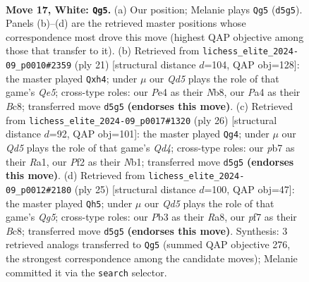 \documentclass[11pt]{article}
\begin{document}
\begin{figure}[p]\centering
\begin{subfigure}{0.46\textwidth}\centering
\resizebox{\linewidth}{!}{%
\newchessgame
\chessboard[
  setfen={2br3k/1p2qp1p/r1nb1np1/p2Q4/P3P3/1P3NP1/1B3PBP/RN2R1K1 w - - 1 17},
  showmover=false,
  pgfstyle=straightmove, color=movearrow, markmove={d5-g5}
]}
\caption{}
\end{subfigure}\hfill
\begin{subfigure}{0.46\textwidth}\centering
\resizebox{\linewidth}{!}{%
\newchessgame
\chessboard[
  setfen={rnb2rk1/pp3pp1/4pn1p/8/1b1Nq2B/2NBP3/PPQ2PPP/R3K2R b KQ - 2 11},
  showmover=false,
  pgfstyle=straightmove, color=movearrow, markmove={e4-h4}
]}
\caption{}
\end{subfigure}
\\[4pt]
\begin{subfigure}{0.46\textwidth}\centering
\resizebox{\linewidth}{!}{%
\newchessgame
\chessboard[
  setfen={r1br2k1/pp2bppp/q1n1p3/3nP3/2NQ4/1P4P1/PB3PBP/RN3RK1 w - - 1 14},
  showmover=false,
  pgfstyle=straightmove, color=movearrow, markmove={d4-g4}
]}
\caption{}
\end{subfigure}\hfill
\begin{subfigure}{0.46\textwidth}\centering
\resizebox{\linewidth}{!}{%
\newchessgame
\chessboard[
  setfen={r1b1k2r/1p2bppp/p3pn2/8/P1B3q1/2N2P2/1P2Q1PP/R1BR2K1 b kq - 0 13},
  showmover=false,
  pgfstyle=straightmove, color=movearrow, markmove={g4-h5}
]}
\caption{}
\end{subfigure}
\caption{\textbf{Move 17, White: \texttt{Qg5}.} (a) Our position; Melanie plays \texttt{Qg5} (\texttt{d5g5}). Panels (b)--(d) are the retrieved master positions whose correspondence most drove this move (highest QAP objective among those that transfer to it). (b) Retrieved from \texttt{lichess\_elite\_2024-09\_p0010\#2359} (ply 21) [structural distance $d$=104, QAP obj=128]: the master played \texttt{Qxh4}; under $\mu$ our \emph{Qd5} plays the role of that game's \emph{Qe5}; cross-type roles: our \emph{P}e4 as their \emph{N}b8, our \emph{P}a4 as their \emph{B}c8; transferred move \texttt{d5g5} \textbf{(endorses this move)}. (c) Retrieved from \texttt{lichess\_elite\_2024-09\_p0017\#1320} (ply 26) [structural distance $d$=92, QAP obj=101]: the master played \texttt{Qg4}; under $\mu$ our \emph{Qd5} plays the role of that game's \emph{Qd4}; cross-type roles: our \emph{p}b7 as their \emph{R}a1, our \emph{P}f2 as their \emph{N}b1; transferred move \texttt{d5g5} \textbf{(endorses this move)}. (d) Retrieved from \texttt{lichess\_elite\_2024-09\_p0012\#2180} (ply 25) [structural distance $d$=100, QAP obj=47]: the master played \texttt{Qh5}; under $\mu$ our \emph{Qd5} plays the role of that game's \emph{Qg5}; cross-type roles: our \emph{P}b3 as their \emph{R}a8, our \emph{p}f7 as their \emph{B}c8; transferred move \texttt{d5g5} \textbf{(endorses this move)}. Synthesis: 3 retrieved analogs transferred to \texttt{Qg5} (summed QAP objective 276, the strongest correspondence among the candidate moves); Melanie committed it via the \texttt{search} selector.}
\label{fig:thought-m32}
\end{figure}
\end{document}
